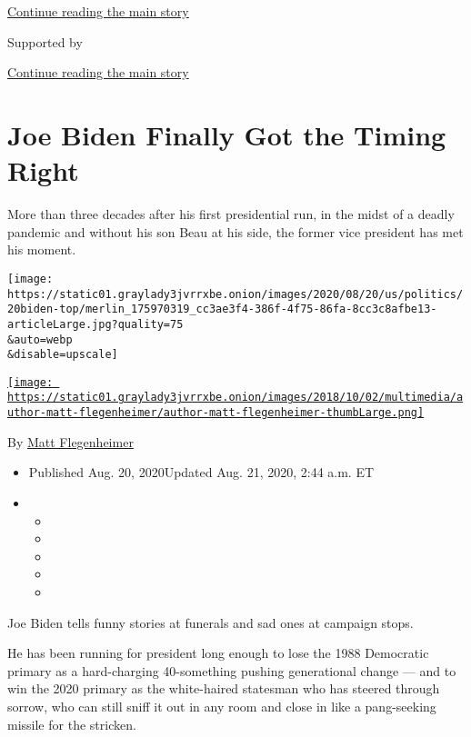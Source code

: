 \protect\hyperlink{after-top}{Continue reading the main story}

Supported by

\protect\hyperlink{after-sponsor}{Continue reading the main story}

\hypertarget{joe-biden-finally-got-the-timing-right}{%
\section{Joe Biden Finally Got the Timing
Right}\label{joe-biden-finally-got-the-timing-right}}

More than three decades after his first presidential run, in the midst
of a deadly pandemic and without his son Beau at his side, the former
vice president has met his moment.

\texttt{[image: https://static01.graylady3jvrrxbe.onion/images/2020/08/20/us/politics/20biden-top/merlin\_175970319\_cc3ae3f4-386f-4f75-86fa-8cc3c8afbe13-articleLarge.jpg?quality=75\\\&auto=webp\\\&disable=upscale]}

\href{https://www.nytimes3xbfgragh.onion/by/matt-flegenheimer}{\texttt{[image: https://static01.graylady3jvrrxbe.onion/images/2018/10/02/multimedia/author-matt-flegenheimer/author-matt-flegenheimer-thumbLarge.png]}}

By \href{https://www.nytimes3xbfgragh.onion/by/matt-flegenheimer}{Matt
Flegenheimer}

\begin{itemize}
\item
  Published Aug. 20, 2020Updated Aug. 21, 2020, 2:44 a.m. ET
\item
  \begin{itemize}
  \item
  \item
  \item
  \item
  \item
  \end{itemize}
\end{itemize}

Joe Biden tells funny stories at funerals and sad ones at campaign
stops.

He has been running for president long enough to lose the 1988
Democratic primary as a hard-charging 40-something pushing generational
change --- and to win the 2020 primary as the white-haired statesman who
has steered through sorrow, who can still sniff it out in any room and
close in like a pang-seeking missile for the stricken.

